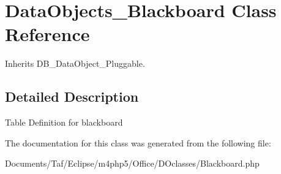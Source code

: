 \hypertarget{classDataObjects__Blackboard}{
\section{DataObjects\_\-Blackboard Class Reference}
\label{classDataObjects__Blackboard}
}
Inherits DB\_\-DataObject\_\-Pluggable.



\subsection{Detailed Description}
Table Definition for blackboard 

The documentation for this class was generated from the following file:\begin{CompactItemize}
\item 
Documents/Taf/Eclipse/m4php5/Office/DOclasses/Blackboard.php\end{CompactItemize}
